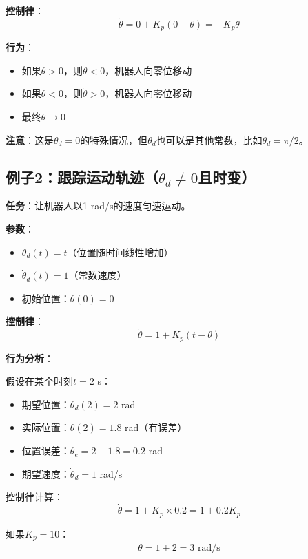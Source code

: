 \documentclass[12pt,a4paper]{article}
\begin{document}
\textbf{控制律}：
\begin{equation}
\dot{\theta} = 0 + K_p(0 - \theta) = -K_p \theta
\end{equation}

\textbf{行为}：
\begin{itemize}
\item 如果$\theta > 0$，则$\dot{\theta} < 0$，机器人向零位移动
\item 如果$\theta < 0$，则$\dot{\theta} > 0$，机器人向零位移动
\item 最终$\theta \to 0$
\end{itemize}

\textbf{注意}：这是$\theta_d = 0$的特殊情况，但$\theta_d$也可以是其他常数，比如$\theta_d = \pi/2$。

\subsection{例子2：跟踪运动轨迹（$\theta_d \neq 0$且时变）}

\textbf{任务}：让机器人以1 rad/s的速度匀速运动。

\textbf{参数}：
\begin{itemize}
\item $\theta_d(t) = t$（位置随时间线性增加）
\item $\dot{\theta}_d(t) = 1$（常数速度）
\item 初始位置：$\theta(0) = 0$
\end{itemize}

\textbf{控制律}：
\begin{equation}
\dot{\theta} = 1 + K_p(t - \theta)
\end{equation}

\textbf{行为分析}：

假设在某个时刻$t = 2$ s：
\begin{itemize}
\item 期望位置：$\theta_d(2) = 2$ rad
\item 实际位置：$\theta(2) = 1.8$ rad（有误差）
\item 位置误差：$\theta_e = 2 - 1.8 = 0.2$ rad
\item 期望速度：$\dot{\theta}_d = 1$ rad/s
\end{itemize}

控制律计算：
\begin{equation}
\dot{\theta} = 1 + K_p \times 0.2 = 1 + 0.2K_p
\end{equation}

如果$K_p = 10$：
\begin{equation}
\dot{\theta} = 1 + 2 = 3 \text{ rad/s}
\end{equation}
\end{document}
